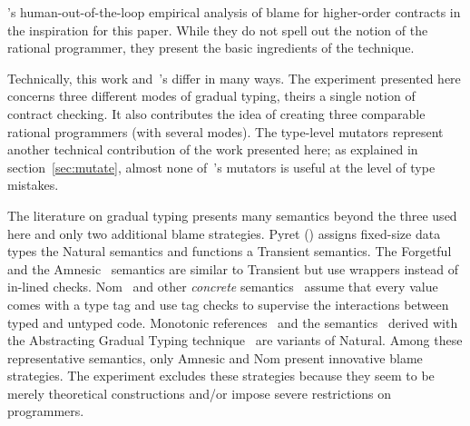 
\citet{lksfd-popl-2020}'s human-out-of-the-loop empirical analysis of blame for
higher-order contracts in the inspiration for this paper.  While they do not
spell out the notion of the rational programmer, they present the basic
ingredients of the technique.

Technically, this work and~\citet{lksfd-popl-2020}'s differ in many ways. The
experiment presented here concerns three different modes of gradual typing,
theirs a single notion of contract checking.  It also contributes the idea of
creating three comparable rational programmers (with several modes). The
type-level mutators represent another technical contribution of the work
presented here; as explained in section~\ref{sec:mutate}, almost none
of~\citet{lksfd-popl-2020}'s mutators is useful at the level of type mistakes.

The literature on gradual typing presents many semantics beyond the three used
here and only two additional blame strategies.  Pyret
() assigns fixed-size data types the Natural
semantics and functions a Transient semantics. The Forgetful~\cite{cl-icfp-2017}
and the Amnesic~\cite{gfd-oopsla-2019} semantics are similar to Transient but
use wrappers instead of in-lined checks.  Nom~\cite{mt-oopsla-2017} and other
\emph{concrete\/} semantics~\cite{wnlov-popl-2010, rsfbv-popl-2015,
rzv-ecoop-2015, rat-oopsla-2017} assume that every value comes with a type tag
and use tag checks to supervise the interactions between typed and untyped code.
Monotonic references~\cite{svctg-esop-2015} and the
semantics~\cite{tlt-popl-2019, etg-icfp-19, tt-scp-20, tgt-popl-18, tt-sas-17}
derived with the Abstracting Gradual Typing technique~\cite{gct-popl-2016} are
variants of Natural.  Among these representative semantics, only Amnesic and Nom
present innovative blame strategies.  The experiment excludes these strategies
because they seem to be merely theoretical constructions and/or impose severe
restrictions on programmers.
 
